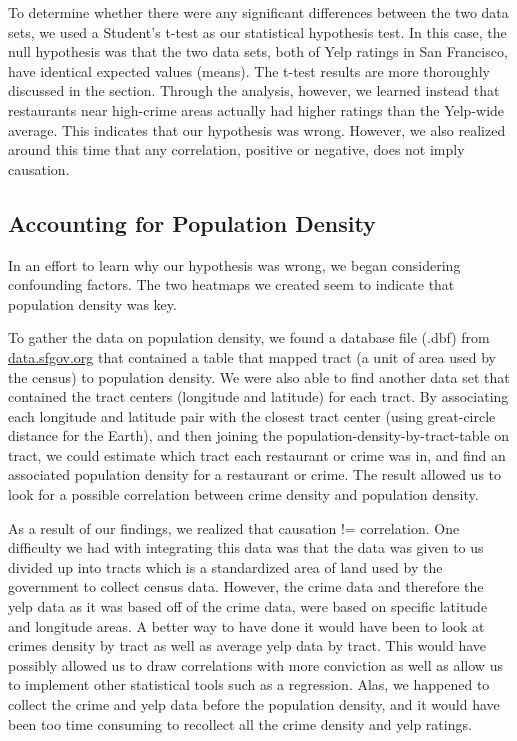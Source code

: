 \documentclass{article}
\begin{document}
To determine whether there were any significant differences between the two
data sets, we used a Student's t-test as our statistical hypothesis
test. In this case, the null hypothesis was that the two data sets, both of
Yelp ratings in San Francisco, have identical expected values (means). The
t-test results are more thoroughly discussed in the
\textbf{} section. Through the analysis, however, we
learned instead that restaurants near high-crime areas actually had higher
ratings than the Yelp-wide average. This indicates that our hypothesis was
wrong. However, we also realized around this time that any correlation,
positive or negative, does not imply causation.

\subsection{Accounting for Population Density}

In an effort to learn why our hypothesis was wrong, we began considering
confounding factors. The two heatmaps we created seem to indicate that
population density was key.


To gather the data on population density, we found a database file (.dbf)
from \url{data.sfgov.org} that contained a table that mapped tract (a unit
of area used by the census) to population density. We were also able to
find another data set that contained the tract centers (longitude and
latitude) for each tract. By associating each longitude and latitude pair
with the closest tract center (using great-circle distance for the Earth),
and then joining the population-density-by-tract-table on tract, we could
estimate which tract each restaurant or crime was in, and find an
associated population density for a restaurant or crime. The result allowed
us to look for a possible correlation between crime density and population
density.

As a result of our findings, we realized that causation != correlation.
One difficulty we had with integrating this data was that the data was given to us divided up into tracts which is a standardized area of land used by the government to collect census data. However, the crime data and therefore the yelp data as it was based off of the crime data, were based on specific latitude and longitude areas. A better way to have done it would have been to look at crimes density by tract as well as average yelp data by tract. This would have possibly allowed us to draw correlations with more conviction as well as allow us to implement other statistical tools such as a regression. Alas, we happened to collect the crime and yelp data before the population density, and it would have been too time consuming to recollect all the crime density and yelp ratings.
\end{document}
